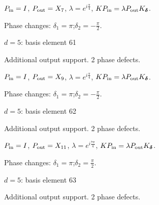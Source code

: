 \vspace{-1mm}
$P_{\rm in}=I$, \quad $P_{\rm out}=X_{7}$, \quad $\lambda=e^{i\frac{\pi}{4}}$, \qquad $K P_{\rm in}=\lambda P_{\rm out}K_{\boldsymbol\delta}$.
\par\smallskip\begin{minipage}{.98\linewidth}\small Phase changes: $\delta_{1}=\pi$;\quad $\delta_{2}=-\frac{\pi}{2}$.\end{minipage}
\vfill
{\footnotesize\texttt{}}
\newpage
{}
{\Large $d=5$: basis element 61}\par
Additional output support. 2 phase defects.
\begin{center}
\end{center}
\vspace{-1mm}
$P_{\rm in}=I$, \quad $P_{\rm out}=X_{9}$, \quad $\lambda=e^{i\frac{\pi}{4}}$, \qquad $K P_{\rm in}=\lambda P_{\rm out}K_{\boldsymbol\delta}$.
\par\smallskip\begin{minipage}{.98\linewidth}\small Phase changes: $\delta_{1}=\pi$;\quad $\delta_{2}=-\frac{\pi}{2}$.\end{minipage}
\vfill
{\footnotesize\texttt{}}
\newpage
{}
{\Large $d=5$: basis element 62}\par
Additional output support. 2 phase defects.
\begin{center}
\end{center}
\vspace{-1mm}
$P_{\rm in}=I$, \quad $P_{\rm out}=X_{11}$, \quad $\lambda=e^{i\frac{7\pi}{4}}$, \qquad $K P_{\rm in}=\lambda P_{\rm out}K_{\boldsymbol\delta}$.
\par\smallskip\begin{minipage}{.98\linewidth}\small Phase changes: $\delta_{1}=\pi$;\quad $\delta_{2}=\frac{\pi}{2}$.\end{minipage}
\vfill
{\footnotesize\texttt{}}
\newpage
{}
{\Large $d=5$: basis element 63}\par
Additional output support. 2 phase defects.
\begin{center}
\end{center}
\vspace{-1mm}
